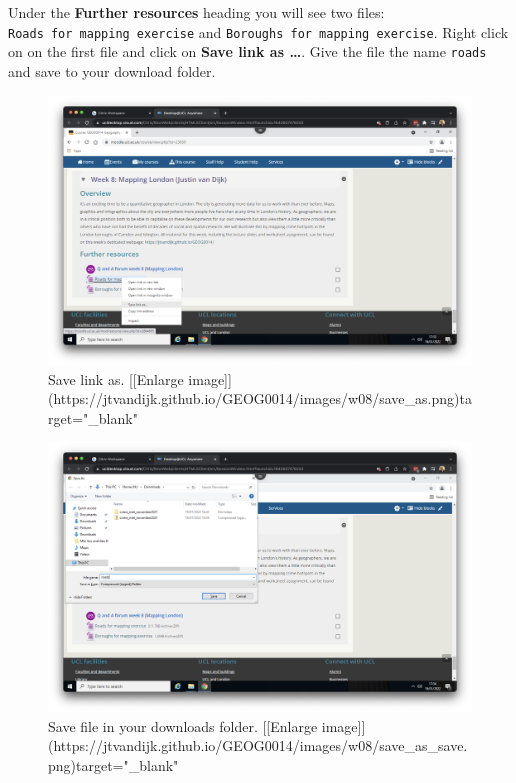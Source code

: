 \documentclass[
]{book}
\begin{document}
Under the \textbf{Further resources} heading you will see two files: \texttt{Roads\ for\ mapping\ exercise} and \texttt{Boroughs\ for\ mapping\ exercise}. Right click on on the first file and click on \textbf{Save link as \ldots{}}. Give the file the name \texttt{roads} and save to your download folder.

\begin{figure}

{\centering \includegraphics[width=850pt]{images/w08/save_as} 

}

\caption{Save link as. [[Enlarge image]](https://jtvandijk.github.io/GEOG0014/images/w08/save_as.png){target="_blank"}}\label{fig:moodle-w8-save}
\end{figure}

\begin{figure}

{\centering \includegraphics[width=850pt]{images/w08/save_as_save} 

}

\caption{Save file in your downloads folder. [[Enlarge image]](https://jtvandijk.github.io/GEOG0014/images/w08/save_as_save.png){target="_blank"}}\label{fig:moodle-w8-save-save}
\end{figure}
\end{document}
